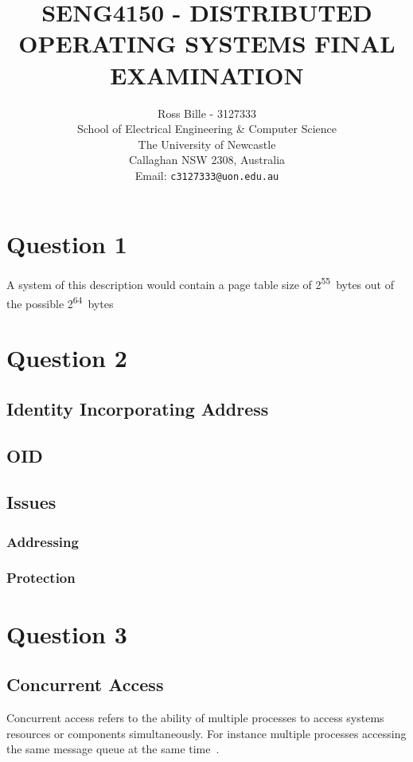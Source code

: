 \documentclass[a4paper,12pt]{article}
\begin{document}
%
\title{\bf SENG4150 - DISTRIBUTED OPERATING SYSTEMS FINAL EXAMINATION}
%
\author{Ross Bille - 3127333\\
School of Electrical Engineering \& Computer Science\\
The University of Newcastle\\ Callaghan NSW 2308, Australia\\
Email: \texttt{c3127333@uon.edu.au} } 

\maketitle
\newpage
\section*{Question 1}
A system of this description would contain a page table size of 2\textsuperscript{55}~bytes out of the possible 2\textsuperscript{64}~bytes


%

\section*{Question 2}
\subsection*{Identity Incorporating Address}
\subsection*{OID}
\subsection*{Issues}
\subsubsection*{Addressing}
\subsubsection*{Protection}
\section*{Question 3}

\subsection*{Concurrent Access}
Concurrent access refers to the ability of multiple processes to access systems resources or components simultaneously. For instance multiple processes accessing the same message queue at the same time~\citep{managing-concurrent-access}.
\end{document}
